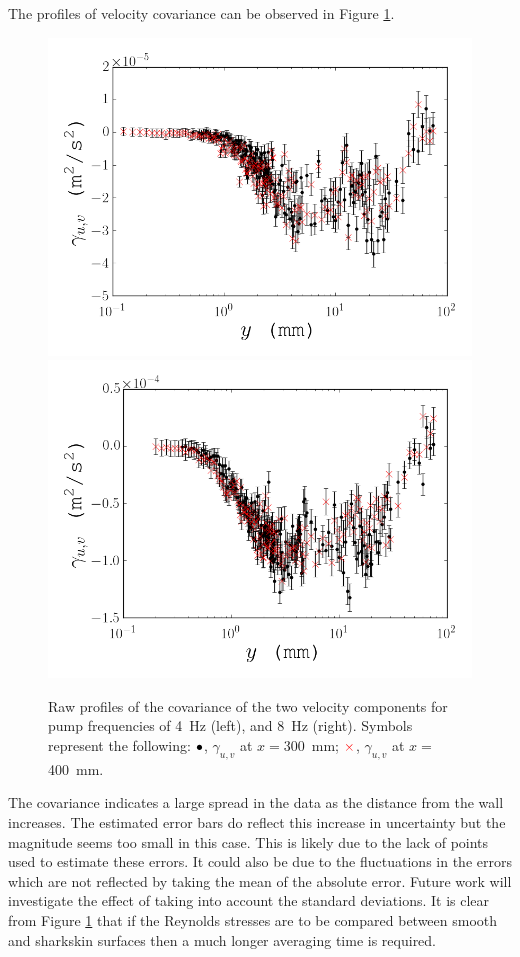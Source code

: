 \documentclass[12pt,oneside,a4paper]{article}
\begin{document}
The profiles of velocity covariance can be observed in Figure \ref{figure:experiments:profiles:gamma}.
%
\begin{figure}[!b]
\centering
\includegraphics[width=0.5\linewidth]{images/LDA_profileImages/cov_4hz.png}\hfill
\includegraphics[width=0.5\linewidth]{images/LDA_profileImages/cov_8hz.png}
\caption{Raw profiles of the covariance of the two velocity components for pump frequencies of \SI{4}{Hz} (left), and \SI{8}{Hz} (right). Symbols represent the following: $\color{black}{\bullet}$, $\gamma_{u,v}$ at $x=$\SI{300}{mm}; $\color{red}{\times}$, $\gamma_{u,v}$ at $x=$\SI{400}{mm}.}
\label{figure:experiments:profiles:gamma}
\end{figure}
%
The covariance indicates a large spread in the data as the distance from the wall increases. The estimated error bars do reflect this increase in uncertainty but the magnitude seems too small in this case. This is likely due to the lack of points used to estimate these errors. It could also be due to the fluctuations in the errors which are not reflected by taking the mean of the absolute error. Future work will investigate the effect of taking into account the standard deviations. It is clear from Figure \ref{figure:experiments:profiles:gamma} that if the Reynolds stresses are to be compared between smooth and sharkskin surfaces then a much longer averaging time is required.
\end{document}
